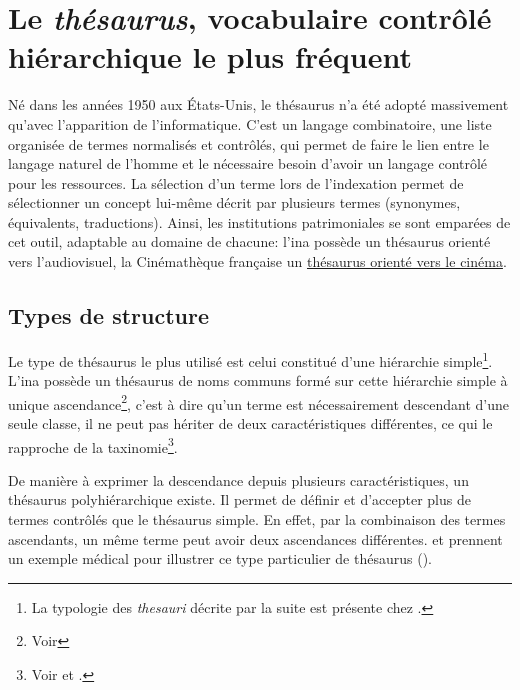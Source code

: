 \section{\label{I-C-2}Le \textit{thésaurus}, vocabulaire contrôlé hiérarchique le plus fréquent}

Né dans les années 1950 aux États-Unis, le thésaurus n'a été adopté massivement qu'avec l'apparition de l'informatique. C'est un langage combinatoire, une liste organisée de termes normalisés et contrôlés, qui permet de faire le lien entre le langage naturel de l'homme et le nécessaire besoin d'avoir un langage contrôlé pour les ressources. La sélection d'un terme lors de l'indexation permet de sélectionner un concept lui-même décrit par plusieurs termes (synonymes, équivalents, traductions). Ainsi, les institutions patrimoniales se sont emparées de cet outil, adaptable au domaine de chacune: l'\ac{ina} possède un thésaurus orienté vers l'audiovisuel, la Cinémathèque française un \href{http://www.cineressources.net/thesaurus/}{thésaurus orienté vers le cinéma}.

\subsection{\label{I-C-2-a}Types de structure}

Le type de thésaurus le plus utilisé est celui constitué d'une hiérarchie simple\footnote{La typologie des \textit{thesauri} décrite par la suite est présente chez \cite{rosenfeld_information_2015}.}. L'\ac{ina} possède un thésaurus de noms communs formé sur cette hiérarchie simple à unique ascendance\footnote{Voir }, c'est à dire qu'un terme est nécessairement descendant d'une seule classe, il ne peut pas hériter de deux caractéristiques différentes, ce qui le rapproche de la taxinomie\footnote{Voir  et .}.

 

De manière à exprimer la descendance depuis plusieurs caractéristiques, un thésaurus polyhiérarchique existe. Il permet de définir et d'accepter plus de termes contrôlés que le thésaurus simple. En effet, par la combinaison des termes ascendants, un même terme peut avoir deux ascendances différentes.  et  prennent un exemple médical pour illustrer ce type particulier de thésaurus ().

